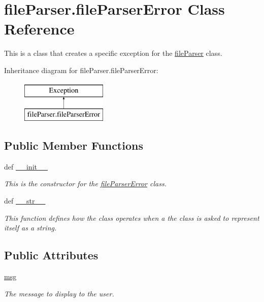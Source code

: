 \hypertarget{classfile_parser_1_1file_parser_error}{\section{file\-Parser.\-file\-Parser\-Error Class Reference}
\label{classfile_parser_1_1file_parser_error}
}


This is a class that creates a specific exception for the \hyperlink{classfile_parser_1_1file_parser}{file\-Parser} class.  


Inheritance diagram for file\-Parser.\-file\-Parser\-Error\-:\begin{figure}[H]
\begin{center}
\leavevmode
\includegraphics[height=2.000000cm]{classfile_parser_1_1file_parser_error}
\end{center}
\end{figure}
\subsection*{Public Member Functions}
\begin{DoxyCompactItemize}
\item 
def \hyperlink{classfile_parser_1_1file_parser_error_aa3fbd8b07486310a324f24c7c11776cf}{\-\_\-\-\_\-init\-\_\-\-\_\-}
\begin{DoxyCompactList}\small\item\em This is the constructor for the \hyperlink{classfile_parser_1_1file_parser_error}{file\-Parser\-Error} class. \end{DoxyCompactList}\item 
def \hyperlink{classfile_parser_1_1file_parser_error_ab6f80a5cd6e1e0edc808b41df0c85d16}{\-\_\-\-\_\-str\-\_\-\-\_\-}
\begin{DoxyCompactList}\small\item\em This function defines how the class operates when a the class is asked to represent itself as a string. \end{DoxyCompactList}\end{DoxyCompactItemize}
\subsection*{Public Attributes}
\begin{DoxyCompactItemize}
\item 
\hyperlink{classfile_parser_1_1file_parser_error_a10a1298f8ac5493a909514edf50e26bc}{msg}
\begin{DoxyCompactList}\small\item\em The message to display to the user. \end{DoxyCompactList}\end{DoxyCompactItemize}


